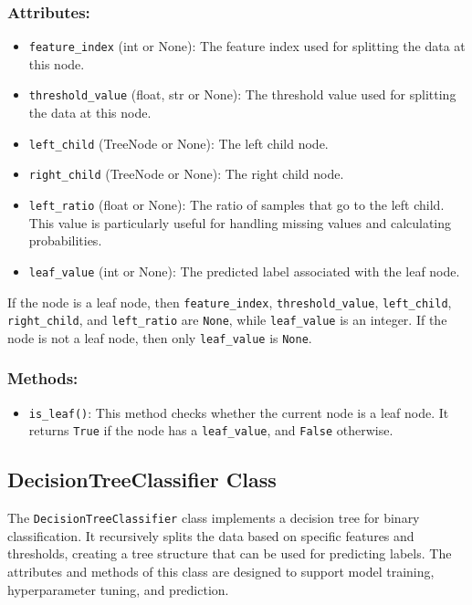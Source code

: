 \documentclass{article}
\begin{document}
\subsubsection*{Attributes:}
\begin{itemize}
    \item \texttt{feature\_index} (int or None): The feature index used for splitting the data at this node.
    \item \texttt{threshold\_value} (float, str or None): The threshold value used for splitting the data at this node.
    \item \texttt{left\_child} (TreeNode or None): The left child node.
    \item \texttt{right\_child} (TreeNode or None): The right child node.
    \item \texttt{left\_ratio} (float or None): The ratio of samples that go to the left child. This value is particularly useful for handling missing values and calculating probabilities.
    \item \texttt{leaf\_value} (int or None): The predicted label associated with the leaf node.
\end{itemize}

\noindent If the node is a leaf node, then \texttt{feature\_index}, \texttt{threshold\_value}, \texttt{left\_child}, \texttt{right\_child}, and \texttt{left\_ratio} are \texttt{None}, while \texttt{leaf\_value} is an integer. If the node is not a leaf node, then only \texttt{leaf\_value} is \texttt{None}.

\subsubsection*{Methods:}
\begin{itemize}
    \item \texttt{is\_leaf()}: This method checks whether the current node is a leaf node. It returns \texttt{True} if the node has a \texttt{leaf\_value}, and \texttt{False} otherwise.
\end{itemize}

\subsection{DecisionTreeClassifier Class}

The \texttt{DecisionTreeClassifier} class implements a decision tree for binary classification. It recursively splits the data based on specific features and thresholds, creating a tree structure that can be used for predicting labels. The attributes and methods of this class are designed to support model training, hyperparameter tuning, and prediction.
\end{document}
